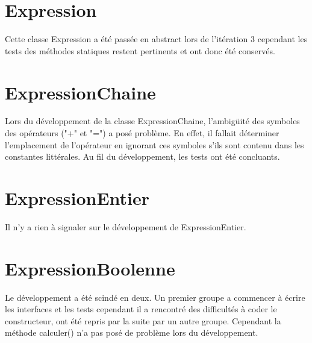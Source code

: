 
\section{Expression}

Cette classe Expression a été passée en abstract lors de l'itération 3
cependant les tests des méthodes statiques restent pertinents et ont donc
été conservés.

\section{ExpressionChaine}

Lors du développement de la classe ExpressionChaine, l'ambigüité des symboles
des opérateurs ("+" et "=") a posé problème. En effet, il fallait déterminer
l'emplacement de l'opérateur en ignorant ces symboles s'ils sont contenu dans
les constantes littérales. Au fil du développement, les tests ont été concluants.

\section{ExpressionEntier}

Il n'y a rien à signaler sur le développement de ExpressionEntier.

\section{ExpressionBoolenne}

Le développement a été scindé en deux. Un premier groupe a commencer à écrire
les interfaces et les tests cependant il a rencontré des difficultés à coder
le constructeur, ont été repris par la suite par un autre groupe.
Cependant la méthode calculer() n'a pas posé de problème lors du développement.
